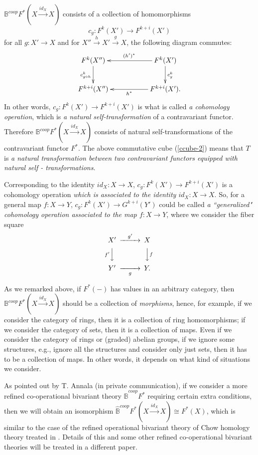 \documentclass[a4paper]{amsart}
\begin{document}
$ \mathbb B^{coop}F^{*}(X \xrightarrow {id_X} X)$ consists of a collection of homomorphisms
$$c_g: F^k(X') \to F^{k+i}(X')$$
for all $g:X' \to X$  and for $X'' \xrightarrow {h} X' \xrightarrow g X$, the following diagram commutes:
$$
\xymatrix
{F^k(X'') \ar[d]_{c_{g \circ h}^k} && F^k(X')\ar[ll]_{(h')^*} \ar[d]^{c_g^k}\\
F^{k+i}(X'') && F^{k+i}(X') \ar[ll]^{h^*}.
}
$$ 
In other words, $c_g: F^k(X') \to F^{k+i}(X')$ is what is called \emph{a cohomology operation}, which is \emph{a natural self-transformation} of a contravariant functor. Therefore $ \mathbb B^{coop}F^{*}(X \xrightarrow {id_X} X)$ consists of natural self-transformations of the contravariant functor $F^*$. The above commutative cube (\ref{ccube-2}) means that $T$ is \emph{a natural transformation between two contravariant functors equipped with natural self - transformations}.
\begin{rem} Corresponding to the identity $id_X:X \to X$, $c_g: F^k(X') \to F^{k+i}(X')$ is a cohomology operation \emph{which is associated to the identity $id_X:X \to X$}. So, for a general map $f: X \to Y$,
$c_g: F^k(X') \to G^{k+i}(Y')$ could be called \emph{a ``generalized" cohomology operation associated to the map $f:X \to Y$}, where we consider
the fiber square \, \, \, 
\begin{equation*}
\CD
X' @> {g'}  >> X\\
@V {f'} VV @VV fV\\
Y' @>> {g} > Y.\\
\endCD
\end{equation*}
\end{rem}
\begin{rem}
As we remarked above, if $F^*(-)$ has values in an arbitrary category, then $ \mathbb B^{coop}F^{*}(X \xrightarrow {id_X} X)$ should be a collection of \emph{morphisms}, hence, for example, if we consider the category of rings, then it is a collection of ring homomorphisms; if we consider the category of sets, then it is a collection of maps. Even if we consider the category of rings or (graded) abelian groups, if we ignore some structures, e.g., ignore all the structures and consider only just sets, then it has to be a collection of maps. In other words, it depends on what kind of situations we consider. 
\end{rem}
\begin{rem} As pointed out by T. Annala (in private communication), if we consider a more refined co-operational bivariant theory $ \widehat{\mathbb B}^{coop}F^{*}$ requiring certain extra conditions, then we will obtain an isomorphism $\widehat{\mathbb B}^{coop}F^{*}(X \xrightarrow {id_X} X) \cong F^*(X)$, which is similar to the case of the refined operational bivariant theory of Chow homology theory treated in \cite[\S 17.3]{Ful}.
Details of this and some other refined co-operational bivariant theories will be treated in a different paper.
\end{rem}
\end{document}
